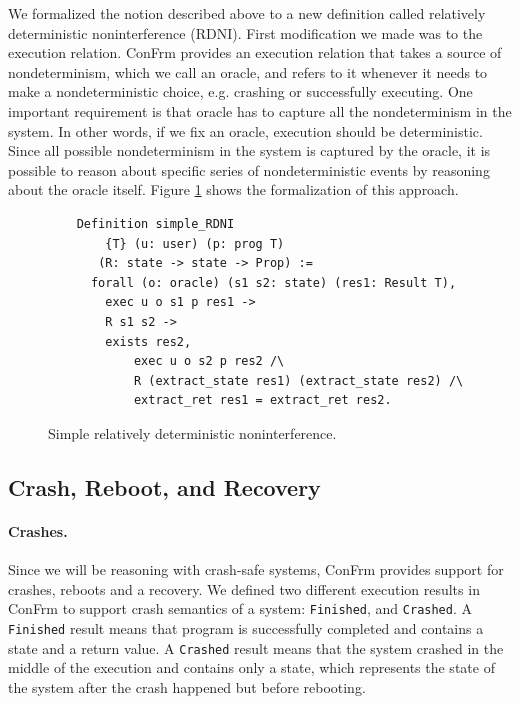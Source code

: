 We formalized the notion described above to a new definition called relatively deterministic noninterference (RDNI). First modification we made was to the execution relation. ConFrm provides an execution relation that takes a source of nondeterminism, which we call an oracle, and refers to it whenever it needs to make a nondeterministic choice, e.g. crashing or successfully executing. One important requirement is that oracle has to capture all the nondeterminism in the system. In other words, if we fix an oracle, execution should be deterministic. Since all possible nondeterminism in the system is captured by the oracle, it is possible to reason about specific series of nondeterministic events by reasoning about the oracle itself. Figure \ref{fig:RDNI_no_recovery} shows the formalization of this approach.

\begin{figure}[ht]
    \centering
    \begin{verbatim}
    Definition simple_RDNI
        {T} (u: user) (p: prog T)
       (R: state -> state -> Prop) :=
      forall (o: oracle) (s1 s2: state) (res1: Result T),
        exec u o s1 p res1 ->
        R s1 s2 ->
        exists res2, 
            exec u o s2 p res2 /\
            R (extract_state res1) (extract_state res2) /\
            extract_ret res1 = extract_ret res2.
    \end{verbatim}
    \caption{Simple relatively deterministic noninterference.}
    \label{fig:RDNI_no_recovery}
\end{figure}

\subsection{Crash, Reboot, and Recovery}
\paragraph{Crashes.}
Since we will be reasoning with crash-safe systems, ConFrm provides support for crashes, reboots and a recovery. 
We defined two different execution results in ConFrm to support crash semantics of a system: \texttt{Finished}, and \texttt{Crashed}. A \texttt{Finished} result means that program is successfully completed and contains a state and a return value. A \texttt{Crashed} result means that the system crashed in the middle of the execution and contains only a state, which represents the state of the system after the crash happened but before rebooting.

